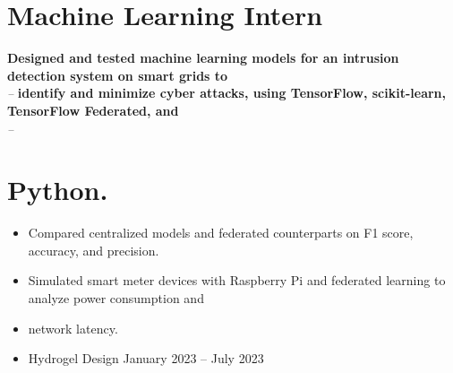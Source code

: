\documentclass[letterpaper,11pt]{article}
\begin{document}
\section{Machine Learning Intern}
\textbf{Designed and tested machine learning models for an intrusion detection system on smart grids to} \hfill  \\
\textit{} \hfill \textit{ -- }
\vspace{2pt}\textbf{identify and minimize cyber attacks, using TensorFlow, scikit-learn, TensorFlow Federated, and} \hfill  \\
\textit{} \hfill \textit{ -- }
\vspace{2pt}







\section{Python.}
\begin{itemize}
  \item Compared centralized models and federated counterparts on F1 score, accuracy, and precision.
  \item Simulated smart meter devices with Raspberry Pi and federated learning to analyze power consumption and
  \item network latency.
  \item Hydrogel Design January 2023 – July 2023
\end{itemize}
\end{document}
